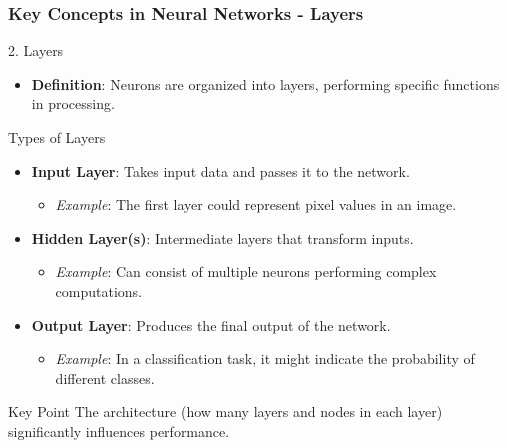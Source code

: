 \documentclass[aspectratio=169]{beamer}
\begin{document}
\begin{frame}[fragile]
    \frametitle{Key Concepts in Neural Networks - Layers}
    \begin{block}{2. Layers}
        \begin{itemize}
            \item \textbf{Definition}: Neurons are organized into layers, performing specific functions in processing.
        \end{itemize}
    \end{block}
    \begin{block}{Types of Layers}
        \begin{itemize}
            \item \textbf{Input Layer}: Takes input data and passes it to the network.
                   \begin{itemize}
                       \item \textit{Example}: The first layer could represent pixel values in an image.
                   \end{itemize}
            \item \textbf{Hidden Layer(s)}: Intermediate layers that transform inputs. 
                   \begin{itemize}
                       \item \textit{Example}: Can consist of multiple neurons performing complex computations.
                   \end{itemize}
            \item \textbf{Output Layer}: Produces the final output of the network.
                   \begin{itemize}
                       \item \textit{Example}: In a classification task, it might indicate the probability of different classes.
                   \end{itemize}
        \end{itemize}
    \end{block}
    \begin{block}{Key Point}
        The architecture (how many layers and nodes in each layer) significantly influences performance.
    \end{block}
\end{frame}
\end{document}
